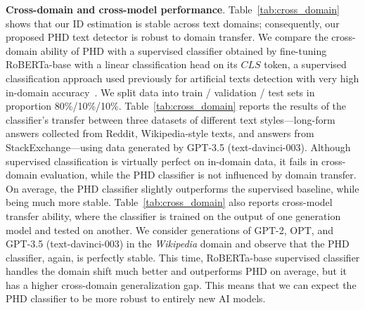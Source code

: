 \documentclass{article}
\begin{document}
\textbf{Cross-domain and cross-model performance}.
Table~\ref{tab:cross_domain} shows that our ID estimation is stable across text domains; consequently, our proposed PHD text detector is robust to domain transfer. We compare the cross-domain ability of PHD with a supervised classifier obtained by fine-tuning RoBERTa-base with a linear classification head on its $CLS$ token, a supervised classification approach used previously for artificial texts detection with very high in-domain accuracy~\citep{solaiman2019release, guo2023close, he2023mgtbench}. We split data into train / validation / test sets in proportion 80\%/10\%/10\%. Table~\ref{tab:cross_domain} reports the results of the classifier's transfer between three datasets of different text styles---long-form answers collected from Reddit, Wikipedia-style texts, and answers from StackExchange---using data generated by GPT-3.5 (text-davinci-003). Although supervised classification is virtually perfect on in-domain data, it fails in cross-domain evaluation, while the PHD classifier is not influenced by domain transfer. On average, the PHD classifier slightly outperforms the supervised baseline, while being much more stable. 
Table~\ref{tab:cross_domain} also reports cross-model transfer ability, where the classifier is trained on the output of one generation model and tested on another. We consider generations of GPT-2, OPT, and GPT-3.5 (text-davinci-003) in the \emph{Wikipedia} domain
and observe that the PHD classifier, again, is perfectly stable. This time, RoBERTa-base supervised classifier handles the domain shift much better and outperforms PHD on average, but it has a higher cross-domain generalization gap. This means that we can expect the PHD classifier to be more robust to entirely new AI models.
\end{document}
